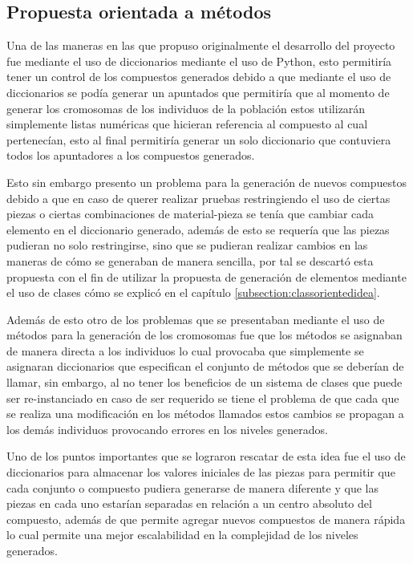 \subsection{Propuesta orientada a métodos}
\label{subsection:objectorientedidea}

Una de las maneras en las que propuso originalmente el desarrollo del proyecto
fue mediante el uso de diccionarios mediante el uso de Python, esto permitiría
tener un control de los compuestos generados debido a que mediante el uso de
diccionarios se podía generar un apuntados que permitiría que al momento de
generar los cromosomas de los individuos de la población estos utilizarán
simplemente listas numéricas que hicieran referencia al compuesto al cual
pertenecían, esto al final permitiría generar un solo diccionario que
contuviera todos los apuntadores a los compuestos generados.

Esto sin embargo presento un problema para la generación de nuevos compuestos
debido a que en caso de querer realizar pruebas restringiendo el uso de ciertas
piezas o ciertas combinaciones de material-pieza se tenía que cambiar cada
elemento en el diccionario generado, además de esto se requería que las
piezas pudieran no solo restringirse, sino que se pudieran realizar cambios en
las maneras de cómo se generaban de manera sencilla, por tal se descartó esta
propuesta con el fin de utilizar la propuesta de generación de elementos
mediante el uso de clases cómo se explicó en el capítulo
\ref{subsection:classorientedidea}.

Además de esto otro de los problemas que se presentaban mediante el uso de
métodos para la generación de los cromosomas fue que los métodos se asignaban de
manera directa a los individuos lo cual provocaba que simplemente se asignaran
diccionarios que especifican el conjunto de métodos que se deberían de llamar,
sin embargo, al no tener los beneficios de un sistema de clases que puede ser
re-instanciado en caso de ser requerido se tiene el problema de que cada que se
realiza una modificación en los métodos llamados estos cambios se propagan a los
demás individuos provocando errores en los niveles generados.

Uno de los puntos importantes que se lograron rescatar de esta idea fue el uso
de diccionarios para almacenar los valores iniciales de las piezas para permitir
que cada conjunto o compuesto pudiera generarse de manera diferente y que las
piezas en cada uno estarían separadas en relación a un centro absoluto del
compuesto, además de que permite agregar nuevos compuestos de manera rápida lo
cual permite una mejor escalabilidad en la complejidad de los niveles generados.

